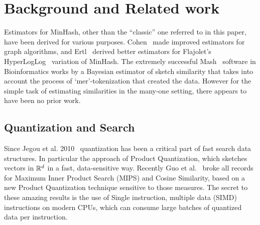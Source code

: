 
\section{Background and Related work}

Estimators for MinHash, other than the ``classic'' one referred to in this paper, have been derived for various purposes.
Cohen~\cite{DBLP:reference/algo/Cohen16b} made improved estimators for graph algorithms,
and Ertl~\cite{DBLP:journals/corr/Ertl17} derived better estimators for Flajolet's HyperLogLog~\cite{flajolet1985probabilistic} variation of MinHash.
%
The extremely successful Mash~\cite{ondov2016mash} software in Bioinformatics works by
a Bayesian estimator of sketch similarity that takes into account the process of `mer'-tokenization that created the data.
However for the simple task of estimating similarities in the many-one setting, there appears to have been no prior work.




\subsection{Quantization and Search}

Since Jegou et al. 2010~\cite{jegou2010product} quantization has been a critical part of fast search data structures.
In particular the approach of Product Quantization, which sketches vectors in $\mathbb{R}^d$ in a fast, data-sensitive way.
Recently Guo et al.~\cite{guo2020accelerating} broke all records~\cite{aumuller2017ann} for Maximum Inner Product Search (MIPS) and Cosine Similarity, based on a new Product Quantization technique sensitive to those measures.
The secret to these amazing results is the use of Single instruction, multiple data (SIMD) instructions on modern CPUs, which can consume large batches of quantized data per instruction.

